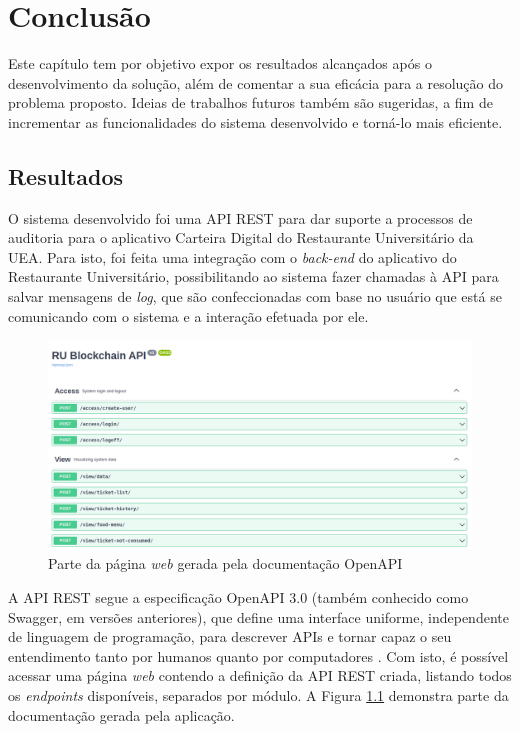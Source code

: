 \chapter{Conclusão}
Este capítulo tem por objetivo expor os resultados alcançados após o desenvolvimento da solução, além de comentar a sua eficácia para a resolução do problema proposto. Ideias de trabalhos futuros também são sugeridas, a fim de incrementar as funcionalidades do sistema desenvolvido e torná-lo mais eficiente.

\section{Resultados}
O sistema desenvolvido foi uma API REST para dar suporte a processos de auditoria para o aplicativo Carteira Digital do Restaurante Universitário da UEA. Para isto, foi feita uma integração com o \emph{back-end} do aplicativo do Restaurante Universitário, possibilitando ao sistema fazer chamadas à API para salvar mensagens de \emph{log}, que são confeccionadas com base no usuário que está se comunicando com o sistema e a interação efetuada por ele.

\begin{figure}
    \centering
    \includegraphics[width=1\textwidth]{img/Cap4/Swagger.png}
    \caption{Parte da página \emph{web} gerada pela documentação OpenAPI}
    \label{fig:openapi}
\end{figure}

A API REST segue a especificação OpenAPI 3.0 (também conhecido como Swagger, em versões anteriores), que define uma interface uniforme, independente de linguagem de programação, para descrever APIs e tornar capaz o seu entendimento tanto por humanos quanto por computadores \cite{openapi_specification}. Com isto, é possível acessar uma página \emph{web} contendo a definição da API REST criada, listando todos os \emph{endpoints} disponíveis, separados por módulo. A Figura \ref{fig:openapi} demonstra parte da documentação gerada pela aplicação. 

